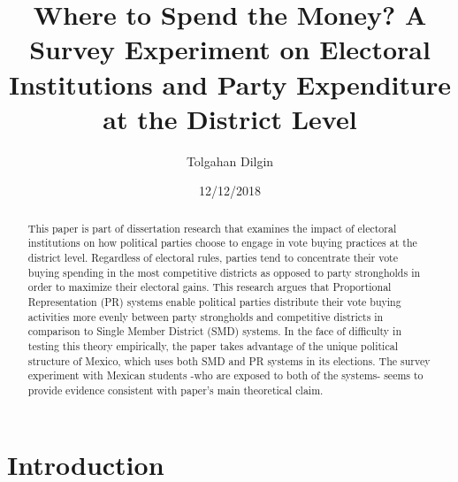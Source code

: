 \documentclass{article}
\begin{document}

	\title{Where to Spend the Money? A Survey Experiment on Electoral Institutions and Party Expenditure at the District Level}
	\author{Tolgahan Dilgin}
	\date{12/12/2018}
	\maketitle
	
\begin{abstract}
   This paper is part of dissertation research that examines the impact of electoral institutions on how political parties choose to engage in vote buying practices at the district level. Regardless of electoral rules, parties tend to concentrate their vote buying spending in the most competitive districts as opposed to party strongholds in order to maximize their electoral gains. This research argues that Proportional Representation (PR) systems enable political parties distribute their vote buying activities more evenly between party strongholds and competitive districts in comparison to Single Member District (SMD) systems. In the face of difficulty in testing this theory empirically, the paper takes advantage of the unique political structure of Mexico, which uses both SMD and PR systems in its elections. The survey experiment with Mexican students -who are exposed to both of the systems- seems to provide evidence consistent with paper's main theoretical claim.
\end{abstract}

\section{Introduction}
\end{document}
